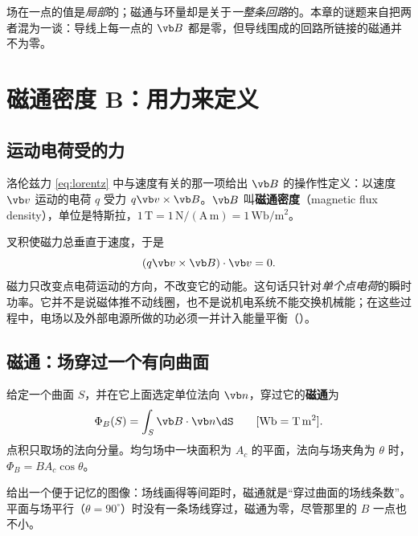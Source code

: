 \begin{intuition}[局部量与回路量]
场在一点的值是\emph{局部}的；磁通与环量却是关于\emph{一整条回路}的。本章的谜题来自把两者混为一谈：导线上每一点的 $\vb B$ 都是零，但导线围成的回路所链接的磁通并不为零。
\end{intuition}

\section{磁通密度 B：用力来定义}\label{sec:magnetic-B}

\subsection{运动电荷受的力}
洛伦兹力 \eqref{eq:lorentz} 中与速度有关的那一项给出 $\vb B$ 的操作性定义：以速度 $\vb v$ 运动的电荷 $q$ 受力 $q\vb v\times\vb B$。$\vb B$ 叫\textbf{磁通密度}（magnetic flux density），单位是特斯拉，$1\,\mathrm T=1\,\mathrm{N/(A\,m)}=1\,\mathrm{Wb/m^2}$。

叉积使磁力总垂直于速度，于是
\begin{equation}
(q\vb v\times\vb B)\cdot\vb v=0 .
\end{equation}
磁力只改变点电荷运动的方向，不改变它的动能。这句话只针对\emph{单个点电荷}的瞬时功率。它并不是说磁体推不动线圈，也不是说机电系统不能交换机械能；在这些过程中，电场以及外部电源所做的功必须一并计入能量平衡（）。

\subsection{磁通：场穿过一个有向曲面}
给定一个曲面 $S$，并在它上面选定单位法向 $\vb n$，穿过它的\textbf{磁通}为
\begin{equation}
\Phi_B(S)=\int_S\vb B\cdot\vb n\dS\qquad[\mathrm{Wb}=\mathrm{T\,m^2}].
\label{eq:atlasflux}
\end{equation}
点积只取场的法向分量。均匀场中一块面积为 $A_c$ 的平面，法向与场夹角为 $\theta$ 时，$\Phi_B=BA_c\cos\theta$。


 给出一个便于记忆的图像：场线画得等间距时，磁通就是“穿过曲面的场线条数”。平面与场平行（$\theta=90^\circ$）时没有一条场线穿过，磁通为零，尽管那里的 $B$ 一点也不小。

